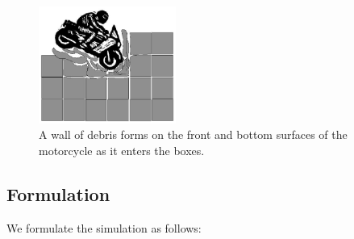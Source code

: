 \documentclass[12pt,a4paper,titlepage]{article}
\begin{document}
\begin{figure}
\caption{\label{debriswall} A wall of debris forms on the front and bottom surfaces of the motorcycle as it enters the boxes.}
\begin{center}
\includegraphics[width=0.4\textwidth]{crush2.eps}
\end{center}
\end{figure}



\subsection{Formulation}

We formulate the simulation as follows:
\end{document}
